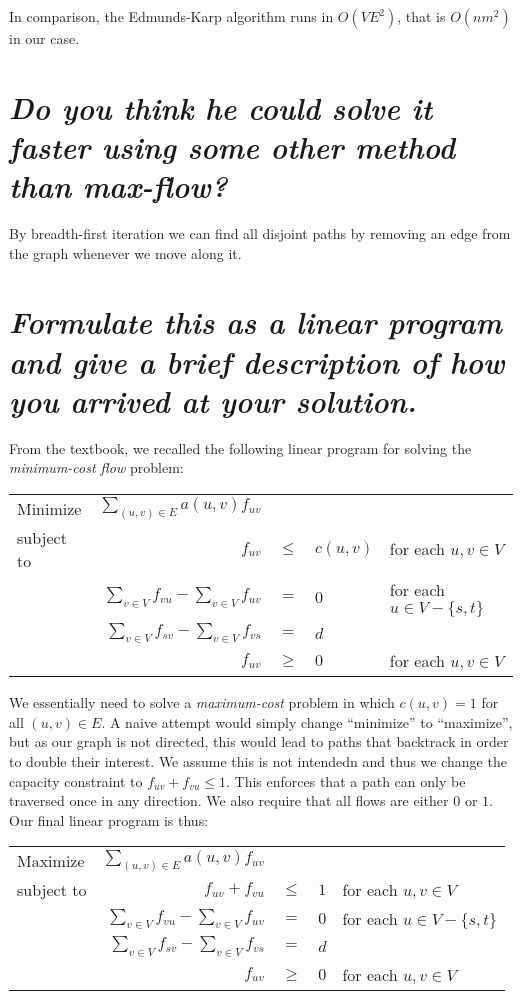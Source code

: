 \documentclass[a4paper, oneside, final]{memoir}
\begin{document}
In comparison, the Edmunds-Karp algorithm runs in $O(V E^2)$, that is
$O(n m^2)$ in our case.

\section{\textit{Do you think he could solve it faster using some
    other method than max-flow?}}

By breadth-first iteration we can find all disjoint paths by removing
an edge from the graph whenever we move along it.

\section{\textit{Formulate this as a linear program and give a brief
    description of how you arrived at your solution.}}

\def\Sum{\displaystyle\sum}

From the textbook, we recalled the following linear program for
solving the \textit{minimum-cost flow} problem:

\begin{tabular}{lrcll}
  Minimize & $\Sum_{(u,v)\in E}a(u,v)f_{u v}$ &&& \\
  subject to & $f_{u v}$ & $\leq$ & $c(u,v)$ & for each $u,v \in
  V$ \\
  & $\Sum_{v\in V}f_{v u} - \Sum_{v\in V}f_{u v}$ &$=$& $0$ & for
  each $u\in V-{\{s,t\}}$ \\
  & $\Sum_{v\in V}f_{s v}-\Sum_{v\in V}f_{v s}$ &$=$& $d$ \\
  & $f_{u v}$ &$\geq$& $0$ & for each $u, v \in V$ \\
\end{tabular}

We essentially need to solve a \textit{maximum-cost} problem in which
$c(u,v)=1$ for all $(u,v)\in E$.  A naive attempt would simply change
``minimize'' to ``maximize'', but as our graph is not directed, this
would lead to paths that backtrack in order to double their interest.
We assume this is not intendedn and thus we change the capacity
constraint to $f_{u v}+f_{v u} \leq 1$.  This enforces that a path can
only be traversed once in any direction.  We also require that all
flows are either $0$ or $1$.  Our final linear program is thus:

\begin{tabular}{lrcll}
  Maximize & $\Sum_{(u,v)\in E}a(u,v)f_{u v}$ &&& \\
  subject to & $f_{u v}+f_{v u}$ & $\leq$ & $1$ & for each $u,v \in
  V$ \\
  & $\Sum_{v\in V}f_{v u} - \Sum_{v\in V}f_{u v}$ &$=$& $0$ & for
  each $u\in V-{\{s,t\}}$ \\
  & $\Sum_{v\in V}f_{s v}-\Sum_{v\in V}f_{v s}$ &$=$& $d$ \\
  & $f_{u v}$ &$\geq$& $0$ & for each $u, v \in V$ \\
\end{tabular}
\end{document}
